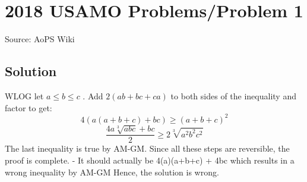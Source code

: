 \documentclass[12pt]{article}
\begin{document}
\section*{{2018 USAMO Problems/Problem 1}}
Source: AoPS Wiki

\subsection*{Solution}
WLOG let $a \leq b \leq c$ . Add $2(ab+bc+ca)$ to both sides of the inequality and factor to get: \[4(a(a+b+c)+bc) \geq (a+b+c)^2\] \[\frac{4a\sqrt[3]{abc}+bc}{2} \geq 2\sqrt[3]{a^2b^2c^2}\] The last inequality is true by AM-GM. Since all these steps are reversible, the proof is complete. - It should actually be 4(a)(a+b+c) + 4bc which results in a wrong inequality by AM-GM Hence, the solution is wrong.
\end{document}
